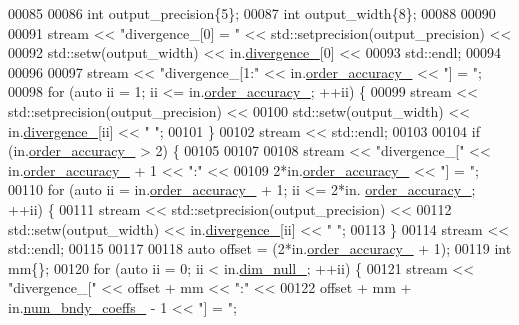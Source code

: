 \begin{DoxyCode}
00085 
00086   \textcolor{keywordtype}{int} output\_precision\{5\};
00087   \textcolor{keywordtype}{int} output\_width\{8\};
00088 
00090 
00091   stream << \textcolor{stringliteral}{"divergence\_[0] = "} << std::setprecision(output\_precision) <<
00092         std::setw(output\_width) << in.\hyperlink{classmtk_1_1Div1D_a0f96410051ba1fa6d91dfa7b7eacead9}{divergence\_}[0] <<
00093     std::endl;
00094 
00096 
00097   stream << \textcolor{stringliteral}{"divergence\_[1:"} << in.\hyperlink{classmtk_1_1Div1D_a9c8a8d7cd08a72dbd1daa8deee06f9c6}{order\_accuracy\_} << \textcolor{stringliteral}{"] = "};
00098   \textcolor{keywordflow}{for} (\textcolor{keyword}{auto} ii = 1; ii <= in.\hyperlink{classmtk_1_1Div1D_a9c8a8d7cd08a72dbd1daa8deee06f9c6}{order\_accuracy\_}; ++ii) \{
00099     stream << std::setprecision(output\_precision) <<
00100       std::setw(output\_width) << in.\hyperlink{classmtk_1_1Div1D_a0f96410051ba1fa6d91dfa7b7eacead9}{divergence\_}[ii] << \textcolor{stringliteral}{" "};
00101   \}
00102   stream << std::endl;
00103 
00104   \textcolor{keywordflow}{if} (in.\hyperlink{classmtk_1_1Div1D_a9c8a8d7cd08a72dbd1daa8deee06f9c6}{order\_accuracy\_} > 2) \{
00105 
00107 
00108     stream << \textcolor{stringliteral}{"divergence\_["} << in.\hyperlink{classmtk_1_1Div1D_a9c8a8d7cd08a72dbd1daa8deee06f9c6}{order\_accuracy\_} + 1 << \textcolor{stringliteral}{":"} <<
00109       2*in.\hyperlink{classmtk_1_1Div1D_a9c8a8d7cd08a72dbd1daa8deee06f9c6}{order\_accuracy\_} << \textcolor{stringliteral}{"] = "};
00110     \textcolor{keywordflow}{for} (\textcolor{keyword}{auto} ii = in.\hyperlink{classmtk_1_1Div1D_a9c8a8d7cd08a72dbd1daa8deee06f9c6}{order\_accuracy\_} + 1; ii <= 2*in.
      \hyperlink{classmtk_1_1Div1D_a9c8a8d7cd08a72dbd1daa8deee06f9c6}{order\_accuracy\_}; ++ii) \{
00111       stream << std::setprecision(output\_precision) <<
00112         std::setw(output\_width) << in.\hyperlink{classmtk_1_1Div1D_a0f96410051ba1fa6d91dfa7b7eacead9}{divergence\_}[ii] << \textcolor{stringliteral}{" "};
00113     \}
00114     stream << std::endl;
00115 
00117 
00118     \textcolor{keyword}{auto} offset = (2*in.\hyperlink{classmtk_1_1Div1D_a9c8a8d7cd08a72dbd1daa8deee06f9c6}{order\_accuracy\_} + 1);
00119     \textcolor{keywordtype}{int} mm\{\};
00120     \textcolor{keywordflow}{for} (\textcolor{keyword}{auto} ii = 0; ii < in.\hyperlink{classmtk_1_1Div1D_a264027144def76d802778391f55381a0}{dim\_null\_}; ++ii) \{
00121       stream << \textcolor{stringliteral}{"divergence\_["} << offset + mm << \textcolor{stringliteral}{":"} <<
00122         offset + mm + in.\hyperlink{classmtk_1_1Div1D_a717240b41eaa2adde858630b9e3d3042}{num\_bndy\_coeffs\_} - 1 << \textcolor{stringliteral}{"] = "};

\end{DoxyCode}
